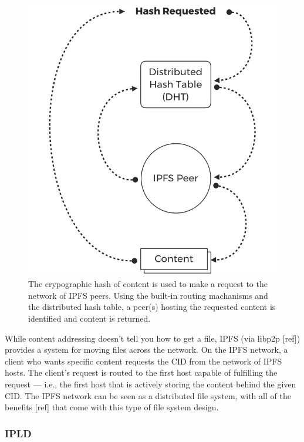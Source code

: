 \documentclass{comjnl}
\begin{document}
\begin{figure}
  \includegraphics[width=\linewidth]{figures/Hash_Request.png}
  \caption{The crypographic hash of content is used to make a request to the network of IPFS peers. Using the built-in routing machanisms and the distributed hash table, a peer(s) hosting the requested content is identified and content is returned. }
  \label{fig:contentaddressing}
\end{figure}

While content addressing doesn’t tell you how to get a file, IPFS (via libp2p [ref]) provides a system for moving files across the network.  On the IPFS network, a client who wants specific content requests the CID from the network of IPFS hosts. The client's request is routed to the first host capable of fulfilling the request — i.e., the first host that is actively storing the content behind the given CID. The IPFS network can be seen as a distributed file system, with all of the benefits [ref] that come with this type of file system design.


\subsubsection{IPLD}
\end{document}
